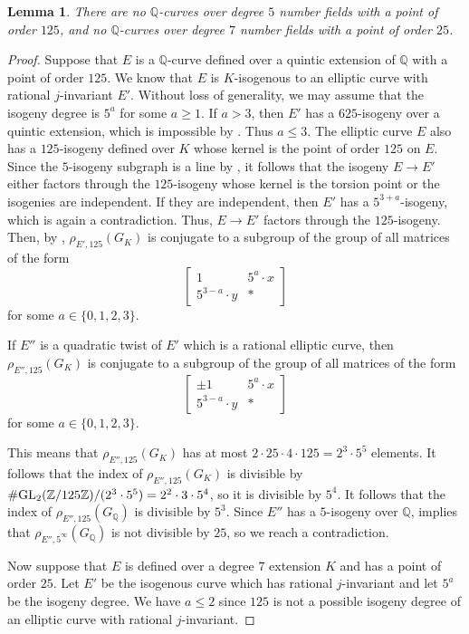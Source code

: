 \documentclass[10pt,leqno]{amsart}
\newcommand\m[1]{\begin{bmatrix}#1\end{bmatrix}}
\newcommand{\Z}{\mathbb{Z}}
\newcommand{\Q}{\mathbb{Q}}
\newcommand{\GL}{\textnormal{GL}}
\newtheorem{lemma}[theorem]{Lemma}
\theoremstyle{definition}
\theoremstyle{remark}
\numberwithin{theorem}{section}
\begin{document}
\begin{lemma}\label{5izogenije}
    There are no $\Q$-curves over degree $5$ number fields with a point of order $125$, and no $\Q$-curves over degree $7$ number fields with a point of order $25$.
\end{lemma}
\begin{proof}
    Suppose that $E$ is a $\Q$-curve defined over a quintic extension of $\Q$ with a point of order $125$. We know that $E$ is $K$-isogenous to an elliptic curve with rational $j$-invariant $E'$. Without  loss of generality, we may assume that the isogeny degree is $5^a$ for some $a\geq 1$. If $a>3$, then $E'$ has a $625$-isogeny over a quintic extension, which is impossible by \cite[Theorem 1.3]{ja}. Thus $a\leq 3$. The elliptic curve $E$ also has a $125$-isogeny defined over $K$ whose kernel is the point of order $125$ on $E$. Since the $5$-isogeny subgraph is a line by , it follows that the isogeny $E \to E'$ either factors through the $125$-isogeny whose kernel is the torsion point or the isogenies are independent. If they are independent, then $E'$ has a $5^{3+a}$-isogeny, which is again a contradiction. Thus, $E \to E'$ factors through the $125$-isogeny. Then, by , $\rho_{E', 125}(G_K)$ is conjugate to a subgroup of the group of all matrices of the form $$\m{1 & 5^a \cdot x \\
    5^{3-a}\cdot y & *}$$ for some $a \in \{0,1,2,3\}$. 

    If $E''$ is a quadratic twist of $E'$ which is a rational elliptic curve, then $\rho_{E'', 125}(G_K)$ is conjugate to a subgroup of the group of  all matrices of the form $$\m{\pm 1 & 5^a \cdot x \\
    5^{3-a}\cdot y & *}$$ for some $a \in \{0,1,2,3\}$. 

This means that $\rho_{E'', 125}(G_K)$ has at most $2\cdot 25\cdot 4 \cdot 125=2^3\cdot 5^5$ elements. It follows that the index of $\rho_{E'', 125}(G_K)$ is divisible by $\#\GL_2(\Z/125\Z)/(2^3\cdot 5^5)=2^2\cdot 3 \cdot 5^4$, so it is divisible by $5^4$. It follows that the index of $\rho_{E'', 125}(G_\Q)$ is divisible by $5^3$. Since $E''$ has a $5$-isogeny over $\Q$,  implies that $\rho_{E'', 5^\infty}(G_\Q)$ is not divisible by $25$, so we reach a contradiction.
    

Now suppose that $E$ is defined over a degree $7$ extension $K$ and has a point of order $25$. Let $E'$ be the isogenous curve which has rational $j$-invariant and let $5^a$ be the isogeny degree. We have $a\leq 2$ since $125$ is not a possible isogeny degree of an elliptic curve with rational $j$-invariant. 


\end{proof}
\end{document}
